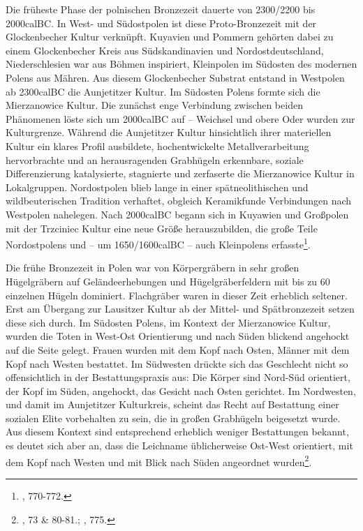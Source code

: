 \documentclass[openany,twoside,twocolumn]{book}
\let\rmarkdownfootnote\footnote%
\def\footnote{\protect\rmarkdownfootnote}
\begin{document}
Die früheste Phase der polnischen Bronzezeit dauerte von 2300/2200 bis
2000calBC. In West- und Südostpolen ist diese Proto-Bronzezeit mit der
Glockenbecher Kultur verknüpft. Kuyavien und Pommern gehörten dabei zu
einem Glockenbecher Kreis aus Südskandinavien und Nordostdeutschland,
Niederschlesien war aus Böhmen inspiriert, Kleinpolen im Südosten des
modernen Polens aus Mähren. Aus diesem Glockenbecher Substrat entstand
in Westpolen ab 2300calBC die Aunjetitzer Kultur. Im Südosten Polens
formte sich die Mierzanowice Kultur. Die zunächst enge Verbindung
zwischen beiden Phänomenen löste sich um 2000calBC auf -- Weichsel und
obere Oder wurden zur Kulturgrenze. Während die Aunjetitzer Kultur
hinsichtlich ihrer materiellen Kultur ein klares Profil ausbildete,
hochentwickelte Metallverarbeitung hervorbrachte und an herausragenden
Grabhügeln erkennbare, soziale Differenzierung katalysierte, stagnierte
und zerfaserte die Mierzanowice Kultur in Lokalgruppen. Nordostpolen
blieb lange in einer spätneolithischen und wildbeuterischen Tradition
verhaftet, obgleich Keramikfunde Verbindungen nach Westpolen nahelegen.
Nach 2000calBC begann sich in Kuyawien und Großpolen mit der Trzciniec
Kultur eine neue Größe herauszubilden, die große Teile Nordostpolens und
-- um 1650/1600calBC -- auch Kleinpolens erfasste\footnote{\textcite{czebreszuk_bronze_2013},
  770-772.}.

Die frühe Bronzezeit in Polen war von Körpergräbern in sehr großen
Hügelgräbern auf Geländeerhebungen und Hügelgräberfeldern mit bis zu 60
einzelnen Hügeln dominiert. Flachgräber waren in dieser Zeit erheblich
seltener. Erst am Übergang zur Lausitzer Kultur ab der Mittel- und
Spätbronzezeit setzen diese sich durch. Im Südosten Polens, im Kontext
der Mierzanowice Kultur, wurden die Toten in West-Ost Orientierung und
nach Süden blickend angehockt auf die Seite gelegt. Frauen wurden mit
dem Kopf nach Osten, Männer mit dem Kopf nach Westen bestattet. Im
Südwesten drückte sich das Geschlecht nicht so offensichtlich in der
Bestattungspraxis aus: Die Körper sind Nord-Süd orientiert, der Kopf im
Süden, angehockt, das Gesicht nach Osten gerichtet. Im Nordwesten, und
damit im Aunjetitzer Kulturkreis, scheint das Recht auf Bestattung einer
sozialen Elite vorbehalten zu sein, die in großen Grabhügeln beigesetzt
wurde. Aus diesem Kontext sind entsprechend erheblich weniger
Bestattungen bekannt, es deutet sich aber an, dass die Leichname
üblicherweise Ost-West orientiert, mit dem Kopf nach Westen und mit
Blick nach Süden angeordnet wurden\footnote{\textcite{dabrowski_aeltere_2004},
  73 \& 80-81.; \textcite{czebreszuk_bronze_2013}, 775.}.
\end{document}
